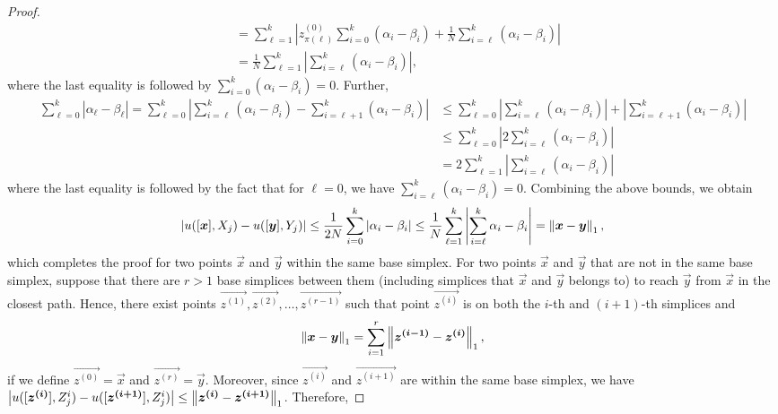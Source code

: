 \begin{proof}
\begin{align*}
         & = \sum_{\ell=1}^k \left|z^{(0)}_{\pi(\ell)} \sum_{i=0}^{k}    (\alpha_i - \beta_i) +  \frac{1}{N}\sum_{i=\ell}^{k}  (\alpha_i - \beta_i) \right|\\
         & = \frac{1}{N} \sum_{\ell=1}^k \left| \sum_{i=\ell}^{k}  (\alpha_i - \beta_i) \right|,
    \end{align*}
    where the last equality is followed by $\sum_{i=0}^k (\alpha_i - \beta_i) =0$. Further,
    \begin{align*}
        \sum_{\ell=0}^k \left| \alpha_\ell - \beta_\ell \right| = \sum_{\ell = 0}^k \left| \sum_{i=\ell}^k (\alpha_i - \beta_i) - \sum_{i=\ell+1}^k (\alpha_i - \beta_i)\right| &\leq \sum_{\ell = 0}^k \left| \sum_{i=\ell}^k (\alpha_i - \beta_i) \right|  + \left| \sum_{i=\ell+1}^k (\alpha_i - \beta_i)\right|\\
        & \leq \sum_{\ell = 0}^k \left| 2\sum_{i=\ell}^k (\alpha_i - \beta_i) \right|\\
        & = 2\sum_{\ell = 1}^k \left| \sum_{i=\ell}^k (\alpha_i - \beta_i) \right|
    \end{align*}
    where the last equality is followed by the fact that for $\ell = 0$, we have $\sum_{i=\ell}^k (\alpha_i - \beta_i) =0$. Combining the above bounds, we obtain
    \begin{align*}
         \left| u([\boldsymbol{x}], X_j) - u([\boldsymbol{y}], Y_j)\right| \leq \frac{1}{2N} \sum_{i=0}^k \left| \alpha_i - \beta_i \right| \leq \frac{1}{N}\sum_{\ell = 1}^k \left| \sum_{i=\ell}^k \alpha_i - \beta_i \right| = \left \| {\boldsymbol{x} - \boldsymbol{y}} \right\|_{1},
    \end{align*}
    which completes the proof for two points $\vec{x}$ and $\vec{y}$ within the same base simplex. For two points $\vec{x}$ and $\vec{y}$ that are not in the same base simplex, suppose that there are $r > 1$ base simplices between them (including simplices that $\vec{x}$ and $\vec{y}$ belongs to) to reach $\vec{y}$ from $\vec{x}$ in the closest path. Hence, there exist points $\vec{z^{(1)}}, \vec{z^{(2)}}, \ldots, \vec{z^{(r-1)}}$ such that point $\vec{z^{(i)}}$ is on both the $i$-th and $(i+1)$-th simplices and
    \begin{align*}
        \left \| {\boldsymbol{x} - \boldsymbol{y}} \right\|_{1} = \sum_{i=1}^{r} \left \| {\boldsymbol{z^{(i-1)}}-\boldsymbol{z^{(i)}}} \right\|_{1},
    \end{align*}
    if we define $\vec{z^{(0)}} = \vec{x}$ and $\vec{z^{(r)}} = \vec{y}$. Moreover, since $\vec{z^{(i)}}$ and $\vec{z^{(i+1)}}$ are within the same base simplex, we have $\left|u([\boldsymbol{z^{(i)}}], Z^i_j) - u([\boldsymbol{z^{(i + 1)}}], Z^i_j)\right| \leq  \left \| {\boldsymbol{z^{(i)}}-\boldsymbol{z^{(i+1)}}} \right\|_{1}$. Therefore,

\end{proof}
